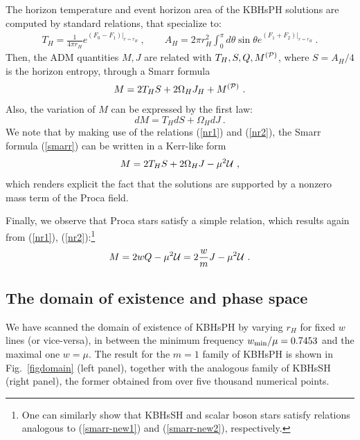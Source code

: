 The horizon temperature and event horizon area of the KBHsPH solutions are computed by standard relations, that specialize to: 
\begin{eqnarray}
\label{THAH}
T_H=\frac{1}{4\pi r_H}e^{(F_0-F_1)|_{r=r_H}} \ , \qquad
 A_H=2\pi r_H^2 \int_0^\pi d\theta \sin \theta  e^{(F_1+F_2)|_{r=r_H}}\ . 
 \end{eqnarray}
Then, the ADM quantities $M,J$ are related with $T_H,S,Q,M^{({\cal P})}$, where $S=A_H/4$ is the horizon entropy, through a Smarr formula  
%
\begin{eqnarray}
\label{smarr} 
M=2 T_H S +2\Omega_H J_H+ M^{({\cal P})} \ .
\end{eqnarray}
Also, the variation of $M$ can be expressed by the first law:
\begin{equation}
\label{fl}
dM=T_H dS +\Omega_H dJ \ .
\end{equation}
We note that
by making use of the relations
(\ref{nr1})
and
(\ref{nr2}),
 the Smarr formula (\ref{smarr})
can be written in a Kerr-like form
\begin{eqnarray}
\label{smarr-new1} 
M=2 T_H S +2\Omega_H J-\mu^2 {\cal U} \ ,
\end{eqnarray}
which renders explicit the fact that the solutions are supported by
a nonzero mass term of the Proca field.

Finally, we observe that Proca stars
satisfy a simple relation, which results again from 
(\ref{nr1}),
(\ref{nr2}):\footnote{One can similarly show that KBHsSH and scalar boson stars satisfy relations analogous to
(\ref{smarr-new1}) and  (\ref{smarr-new2}), respectively.} 
\begin{eqnarray}
\label{smarr-new2} 
M=2 w Q-\mu^2 {\cal U}=2\frac{w}{m} J-\mu^2 {\cal U}\ .
\end{eqnarray}



\subsection{The domain of existence and phase space}
\label{subsec_III}
We have scanned the domain of existence of KBHsPH by varying $r_H$ for fixed $w$ lines (or vice-versa), 
in between the minimum frequency 
$w_{\rm min}/\mu=0.7453$ and the maximal one $w=\mu$. 
The result for the $m=1$ family of KBHsPH is shown in Fig.~\ref{figdomain} (left panel), 
together with the analogous family of KBHsSH (right panel), the former obtained from over five thousand numerical points. 


